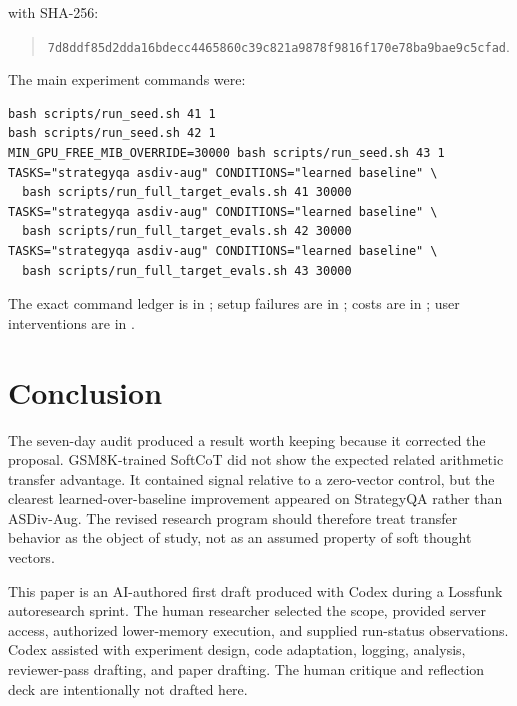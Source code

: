 \documentclass{article}
\begin{document}
with SHA-256:

\begin{quote}
\texttt{7d8ddf85d2dda16bdecc4465860c39c821a9878f9816f170e78ba9bae9c5cfad}.
\end{quote}

The main experiment commands were:

\begin{verbatim}
bash scripts/run_seed.sh 41 1
bash scripts/run_seed.sh 42 1
MIN_GPU_FREE_MIB_OVERRIDE=30000 bash scripts/run_seed.sh 43 1
TASKS="strategyqa asdiv-aug" CONDITIONS="learned baseline" \
  bash scripts/run_full_target_evals.sh 41 30000
TASKS="strategyqa asdiv-aug" CONDITIONS="learned baseline" \
  bash scripts/run_full_target_evals.sh 42 30000
TASKS="strategyqa asdiv-aug" CONDITIONS="learned baseline" \
  bash scripts/run_full_target_evals.sh 43 30000
\end{verbatim}

The exact command ledger is in ; setup failures are in ; costs are in ; user interventions are in .

\section{Conclusion}

The seven-day audit produced a result worth keeping because it corrected the proposal. GSM8K-trained SoftCoT did not show the expected related arithmetic transfer advantage. It contained signal relative to a zero-vector control, but the clearest learned-over-baseline improvement appeared on StrategyQA rather than ASDiv-Aug. The revised research program should therefore treat transfer behavior as the object of study, not as an assumed property of soft thought vectors.

\begin{ack}
This paper is an AI-authored first draft produced with Codex during a Lossfunk autoresearch sprint. The human researcher selected the scope, provided server access, authorized lower-memory execution, and supplied run-status observations. Codex assisted with experiment design, code adaptation, logging, analysis, reviewer-pass drafting, and paper drafting. The human critique and reflection deck are intentionally not drafted here.
\end{ack}



\end{document}
